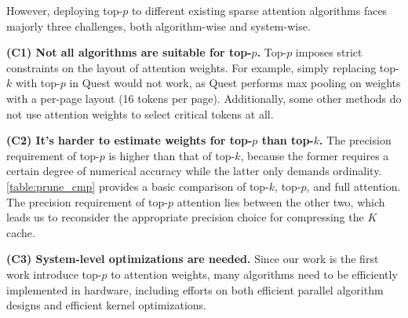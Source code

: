However, deploying top-$p$ to different existing sparse attention algorithms faces majorly three challenges, both algorithm-wise and system-wise.


\textbf{(C1) Not all algorithms are suitable for top-$p$.} Top-$p$ imposes strict constraints on the layout of attention weights. For example, simply replacing top-$k$ with top-$p$ in Quest \cite{tang2024quest} would not work, as Quest performs max pooling on weights with a per-page layout (16 tokens per page). Additionally, some other methods \cite{yang2024tidaldecodefastaccuratellm, liu2024retrievalattention} do not use attention weights to select critical tokens at all.

\textbf{(C2) It's harder to estimate weights for top-$p$ than top-$k$.} 
The precision requirement of top-$p$ is higher than that of top-$k$, because the former requires a certain degree of numerical accuracy while the latter only demands ordinality. 
\autoref{table:prune_cmp} provides a basic comparison of top-$k$, top-$p$, and full attention. The precision requirement of top-$p$ attention lies between the other two, which leads us to reconsider the appropriate precision choice for compressing the $K$ cache.

\textbf{(C3) System-level optimizations are needed.} Since our work is the first work introduce top-$p$ to attention weights, many algorithms need to be efficiently implemented in hardware, including efforts on both efficient parallel algorithm designs and efficient kernel optimizations.

